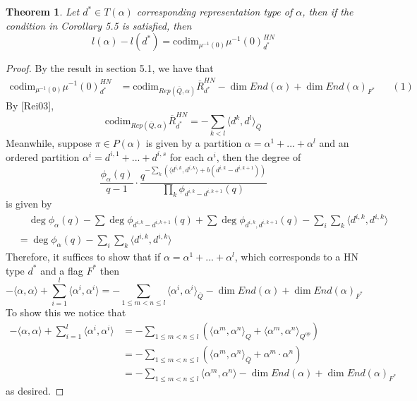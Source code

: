 \documentclass[12pt]{amsart}
\theoremstyle{plain}
\newtheorem{thm}{Theorem}[section]
\theoremstyle{definition}
\theoremstyle{remark}
\begin{document}
\begin{thm}Let $d^*\in T(\alpha)$ corresponding representation type of $\alpha$, then if the condition in Corollary 5.5 is satisfied, then
$$l(\alpha)-l(d^*)=\text{codim}_{\mu^{-1}(0)}\mu^{-1}(0)_{d^*}^{HN}$$
\end{thm}
\begin{proof}
By the result in section 5.1, we have that 
\begin{align*}
    \text{codim}_{\mu^{-1}(0)}\mu^{-1}(0)_{d^*}^{HN}&=\text{codim}_{Rep(\overline{Q},\alpha)}\overline{R}_{d^*}^{HN}-\dim End(\alpha)+\dim End(\alpha)_{F^*}\hspace{20pt}(1)
\end{align*}
By [Rei03],
$$\text{codim}_{Rep(\overline{Q},\alpha)}\overline{R}_{d^*}^{HN}=-\sum_{k<l}\langle d^k,d^l\rangle_{\overline{Q}}$$
Meanwhile, suppose $\pi\in P(\alpha)$ is given by a partition $\alpha=\alpha^1+...+\alpha^l$ and an ordered partition $\alpha^i=d^{i,1}+...+d^{i,s}$ for each $\alpha^i$, then the degree of 
$$\frac{\phi_{\alpha}(q)}{q-1}\cdot \frac{q^{-\sum_{k}(\langle d^{i,k},d^{i,k}\rangle+b(d^{i,k}-d^{i,k+1}))}}{\prod_{k}\phi_{d^{i,k}-d^{i,k+1}}(q)}$$ is given by 
\begin{align*}
    &\hspace{13pt}\deg \phi_{\alpha}(q)-\sum \deg\phi_{d^{i,k}-d^{i,k+1}}(q)+\sum\deg \phi_{d^{i,k},d^{i,k+1}}(q)-\sum_{i}\sum_{k}\langle d^{i,k},d^{i,k}\rangle\\&=\deg \phi_{\alpha}(q)-\sum_{i}\sum_{k}\langle d^{i,k},d^{i,k}\rangle
\end{align*}
Therefore, it suffices to show that if $\alpha=\alpha^1+...+\alpha^l$, which corresponds to a HN type $d^*$ and a flag $F^*$ then 
$$-\langle\alpha,\alpha\rangle+\sum_{i=1}^l\langle \alpha^i,\alpha^i\rangle=-\sum_{1\leq m<n\leq l}\langle \alpha^i,\alpha^i\rangle_{\overline{Q}}-\dim End(\alpha)+\dim End(\alpha)_{F^*}$$
To show this we notice that
\begin{align*}
    -\langle\alpha,\alpha\rangle+\sum_{i=1}^l\langle\alpha^i,\alpha^i\rangle&=-\sum_{1\leq m<n\leq l}(\langle\alpha^m,\alpha^n\rangle_{Q}+\langle\alpha^m,\alpha^n\rangle_{Q^{op}})\\
    &=-\sum_{1\leq m<n\leq l}(\langle\alpha^{m},\alpha^n\rangle_{\overline{Q}}+\alpha^m\cdot\alpha^n)\\
    &=-\sum_{1\leq m<n\leq l}\langle\alpha^{m},\alpha^n\rangle-\dim End(\alpha)+\dim End(\alpha)_{F^*}
\end{align*}
as desired. \end{proof}
\end{document}
